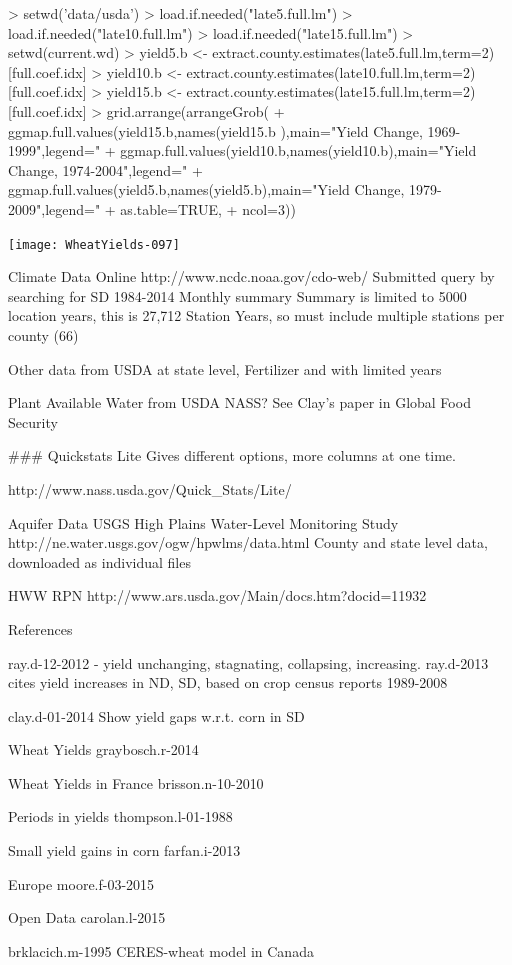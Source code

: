 \documentclass{report}
\begin{document}
\begin{Schunk}
\begin{Sinput}
> setwd('data/usda')
> load.if.needed("late5.full.lm")
> load.if.needed("late10.full.lm")
> load.if.needed("late15.full.lm")
> setwd(current.wd)
> yield5.b <- extract.county.estimates(late5.full.lm,term=2)[full.coef.idx]
> yield10.b <- extract.county.estimates(late10.full.lm,term=2)[full.coef.idx]
> yield15.b <- extract.county.estimates(late15.full.lm,term=2)[full.coef.idx]
> grid.arrange(arrangeGrob(
+    ggmap.full.values(yield15.b,names(yield15.b ),main="Yield Change, 1969-1999",legend="%
+    ggmap.full.values(yield10.b,names(yield10.b),main="Yield Change, 1974-2004",legend="%
+    ggmap.full.values(yield5.b,names(yield5.b),main="Yield Change, 1979-2009",legend="%
+    as.table=TRUE,
+    ncol=3))
\end{Sinput}
\end{Schunk}
\texttt{[image: WheatYields-097]}


Climate Data Online
http://www.ncdc.noaa.gov/cdo-web/
Submitted query by searching for SD
1984-2014
Monthly summary
Summary is limited to 5000 location years, this is 27,712 Station Years, so must include multiple stations per county (66)



Other data from USDA
at state level,
Fertilizer and with limited years

Plant Available Water from USDA NASS? See Clay's paper in Global Food Security

### Quickstats Lite
Gives different options, more columns at one time.

http://www.nass.usda.gov/Quick_Stats/Lite/









Aquifer Data
 USGS High Plains Water-Level Monitoring Study
http://ne.water.usgs.gov/ogw/hpwlms/data.html
County and state level data, downloaded as individual files

HWW RPN
http://www.ars.usda.gov/Main/docs.htm?docid=11932

References

ray.d-12-2012
- yield unchanging, stagnating, collapsing, increasing.
ray.d-2013
cites yield increases in ND, SD, based on crop census reports 1989-2008


clay.d-01-2014
Show yield gaps w.r.t. corn in SD

Wheat Yields
graybosch.r-2014

Wheat Yields in France
brisson.n-10-2010

Periods in yields
thompson.l-01-1988

Small yield gains in corn
farfan.i-2013

Europe
moore.f-03-2015

Open Data
carolan.l-2015

brklacich.m-1995
CERES-wheat model in Canada
\end{document}
